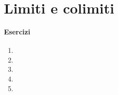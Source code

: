 \chapter{Limiti e colimiti}
\subsubsection*{Esercizi}
\begin{enumerate}
	\item
	\item
	\item
	\item
	\item
\end{enumerate}